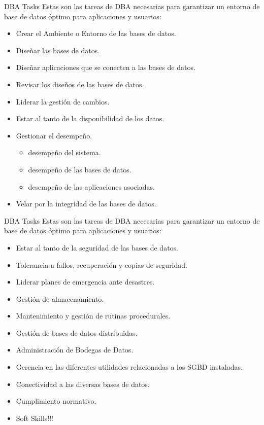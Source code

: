 \documentclass{beamer}
\begin{document}
\begin{frame}{DBA Tasks}
    \centering
    Estas son las tareas de DBA necesarias para garantizar un entorno de base de datos óptimo para aplicaciones y usuarios:
    \begin{itemize}
        \item Crear el Ambiente o Entorno de las bases de datos.
        \item Diseñar las bases de datos.
        \item Diseñar aplicaciones que se conecten a las bases de datos.
        \item Revisar los diseños de las bases de datos.
        \item Liderar la gestión de cambios.
        \item Estar al tanto de la disponibilidad de los datos.
        \item Gestionar el desempeño.
        \begin{itemize}
            \item desempeño del sistema.
            \item desempeño de las bases de datos.
            \item desempeño de las aplicaciones asociadas.
        \end{itemize}
        \item Velar por la integridad de las bases de datos.
    \end{itemize}
\end{frame}

\begin{frame}{DBA Tasks}
    \centering
    Estas son las tareas de DBA necesarias para garantizar un entorno de base de datos óptimo para aplicaciones y usuarios:
    \begin{itemize}
        \item Estar al tanto de la seguridad de las bases de datos.
        \item Tolerancia a fallos, recuperación y copias de seguridad.
        \item Liderar planes de emergencia ante desastres.
        \item Gestión de almacenamiento.
        \item Mantenimiento y gestión de rutinas procedurales.
        \item Gestión de bases de datos distribuidas.
        \item Administración de Bodegas de Datos.
        \item Gerencia en las diferentes utilidades relacionadas a los SGBD instaladas.
        \item Conectividad a las diversas bases de datos.
        \item Cumplimiento normativo.
        \item Soft Skills!!!
    \end{itemize}
\end{frame}
\end{document}
